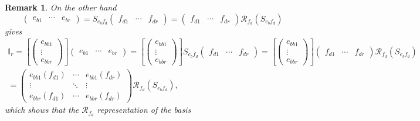 \documentclass[aps,preprint]{revtex4}
\newtheorem{remark}[theorem]{Remark}
\begin{document}
\begin{remark}
On the other hand 
\begin{equation}
\left( 
\begin{array}{ccc}
e_{b1} & \cdots & e_{br}%
\end{array}%
\right) =S_{e_{b}f_{d}}\left( 
\begin{array}{ccc}
f_{d1} & \cdots & f_{dr}%
\end{array}%
\right) =\left( 
\begin{array}{ccc}
f_{d1} & \cdots & f_{dr}%
\end{array}%
\right) \mathcal{R}_{f_{d}}\left( S_{e_{b}f_{d}}\right)
\end{equation}%
gives 
\begin{gather}
\mathbb{I}_{r}=\left[ \left( 
\begin{array}{c}
e_{bb1} \\ 
\vdots \\ 
e_{bbr}%
\end{array}%
\right) \right] \left( 
\begin{array}{ccc}
e_{b1} & \cdots & e_{br}%
\end{array}%
\right) =\left[ \left( 
\begin{array}{c}
e_{bb1} \\ 
\vdots \\ 
e_{bbr}%
\end{array}%
\right) \right] S_{e_{b}f_{d}}\left( 
\begin{array}{ccc}
f_{d1} & \cdots & f_{dr}%
\end{array}%
\right) =\left[ \left( 
\begin{array}{c}
e_{bb1} \\ 
\vdots \\ 
e_{bbr}%
\end{array}%
\right) \right] \left( 
\begin{array}{ccc}
f_{d1} & \cdots & f_{dr}%
\end{array}%
\right) \mathcal{R}_{f_{d}}\left( S_{e_{b}f_{d}}\right) \\
=\left( 
\begin{array}{ccc}
e_{bb1}\left( f_{d1}\right) & \cdots & e_{bb1}\left( f_{dr}\right) \\ 
\vdots & \ddots & \vdots \\ 
e_{bbr}\left( f_{d1}\right) & \cdots & e_{bbr}\left( f_{dr}\right)%
\end{array}%
\right) \mathcal{R}_{f_{d}}\left( S_{e_{b}f_{d}}\right) ,
\end{gather}%
which shows that the $\mathcal{R}_{f_{d}}$ representation of the basis

\end{remark}
\end{document}
